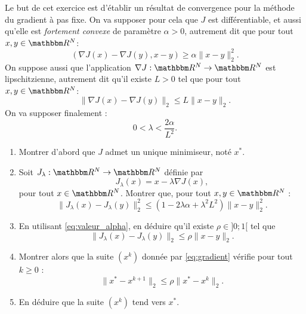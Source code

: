 \medskip

\begin{exercice}

Le but de cet exercice est d'établir un résultat de convergence pour la méthode du gradient à pas fixe. On va supposer pour cela que $J$ est différentiable, et aussi qu'elle est \emph{fortement convexe} de paramètre $\alpha>0$, autrement dit que pour tout $x,y \in \eR^N$: %
\[
( \nabla J(x) - \nabla J(y) , x - y ) \geq \alpha \| x - y \|^2_2.
\]
On suppose aussi que l'application $\nabla J : \eR^N \rightarrow \eR^N$ est lipschitzienne, autrement dit qu'il existe $L>0$ tel que pour tout $x,y \in \eR^N$:
\[
\| \nabla J (x) - \nabla J (y) \|_2 \leq L \| x - y \|_2.
\]
On va supposer finalement : 
\begin{equation}\label{eq:valeur_alpha}
0 < \lambda < \frac{2\alpha}{L^2}.
\end{equation}

\begin{enumerate}

\item Montrer d'abord que $J$ admet un unique minimiseur, noté $x^*$.

\item Soit $J_\lambda : \eR^N \rightarrow \eR^N$ définie par 
\[
J_\lambda ( x ) = x - \lambda \nabla J (x),
\]
pour tout $x\in\eR^N$.
Montrer que, pour tout $x,y\in\eR^N$  :
\[
\| J_\lambda (x) - J_\lambda(y) \|^2_2 \leq (1 - 2 \lambda \alpha + \lambda^2 L^2)  \| x - y \|^2_2.
\]

\item En utilisant \eqref{eq:valeur_alpha}, en déduire qu'il existe $\rho \in ] 0 ; 1 [$ tel que 
\[
\| J_\lambda (x) - J_\lambda(y) \|_2 \leq \rho \| x - y \|_2.
\]

\item Montrer alors que la suite $(x^k)$ donnée par \eqref{eq:gradient} vérifie
 pour tout $k\geq0$ :
 \[
  \| x^* - x^{k+1} \|_2 \leq \rho \| x^* - x^k \|_2.
 \]
 
\item En déduire que la suite $(x^k)$ tend vers $x^*$.
 
\end{enumerate}

\end{exercice}

\medskip

